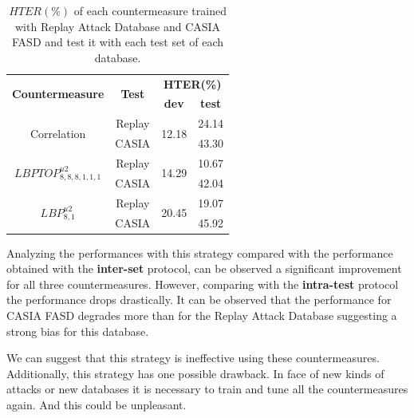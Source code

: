\begin{table}[ht]
\caption{$HTER(\%)$  of each countermeasure trained with Replay Attack Database and CASIA FASD and test it with each test set of each database.}
\begin{center}
  \begin{tabular}{ | c | c | c  c |}
    \hline

   \multirow{2}{*}{\textbf{Countermeasure}} &  \multirow{2}{*}{\textbf{Test}} & \multicolumn{2}{c|}{\textbf{HTER(\%)}} \\ 
    &&\textbf{dev} & \textbf{test}  \\ \hline
    
    \multirow{2}{*}{Correlation} & Replay  &  \multirow{2}{*}{12.18} & 24.14 \\ 
               & CASIA &  & 43.30  \\ \hline \hline

    \multirow{2}{*}{$LBPTOP_{8,8,8,1,1,1}^{u2}$}  & Replay  & \multirow{2}{*}{14.29} & 10.67 \\
               &  CASIA  & & 42.04  \\ \hline \hline

    \multirow{2}{*}{$LBP_{8,1}^{u2}$}  & Replay  & \multirow{2}{*}{20.45} &19.07 \\
                & CASIA  &  & 45.92 \\
    \hline
  \end{tabular}
\end{center}
\label{tb:TrainAllTest}
\end{table}

Analyzing the performances with this strategy compared with the performance obtained with the \textbf{inter-set} protocol, can be observed a significant improvement for all three countermeasures. However, comparing with the \textbf{intra-test} protocol the performance drops drastically. It can be observed that the performance for CASIA FASD degrades more than for the Replay Attack Database suggesting a strong bias for this database. 

We can suggest that this strategy is ineffective using these countermeasures. Additionally, this strategy has one possible drawback. In face of new kinds of attacks or new databases it is necessary to train and tune all the countermeasures again. And this could be unpleasant.




